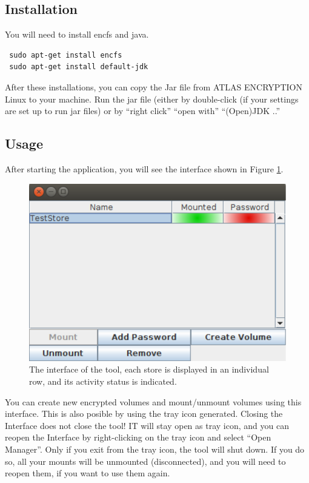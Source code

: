 \documentclass[a4paper,10pt]{report}
\begin{document}
\subsection{Installation}
You will need to install encfs and java.
\begin{lstlisting}
 sudo apt-get install encfs
 sudo apt-get install default-jdk
\end{lstlisting}
After these installations, you can copy the Jar file from ATLAS \textrightarrow ENCRYPTION \textrightarrow Linux to your machine.
Run the jar file (either by double-click (if your settings are set up to run jar files) or by ``right click'' \textrightarrow ``open with'' \textrightarrow ``(Open)JDK ..''

\subsection{Usage}
After starting the application, you will see the interface shown in Figure \ref{interface}.
\begin{figure}
 \includegraphics[width=\textwidth]{Docu/Interface}
  \caption{The interface of the tool, each store is displayed in an individual row, and its activity status is indicated.}
  \label{interface}
\end{figure}
You can create new encrypted volumes and mount/unmount volumes  using this interface. This is also posible by using the tray icon generated.
Closing the Interface does not close the tool! IT will stay open as tray icon, and you can reopen the Interface by right-clicking on the tray icon and select ``Open Manager''.
Only if you exit from the tray icon, the tool will shut down.
If you do so, all your mounts will be unmounted (disconnected), and you will need to reopen them, if you want to use them again.
\end{document}
